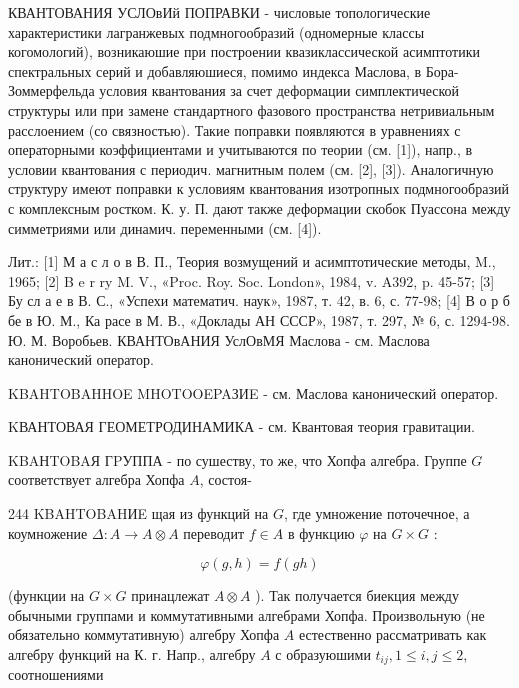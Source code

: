 \documentclass[10pt]{article}
\begin{document}
КВАНТОВАНИЯ УСЛОвИй ПОПРАВКИ - числовые топологические характеристики лагранжевых подмногообразий (одномерные классы когомологий), возникаюшие при построении квазиклассической асимптотики спектральных серий и добавляюшиеся, помимо индекса Маслова, в Бора-Зоммерфельда условия квантования за счет деформации симплектической структуры или при замене стандартного фазового пространства нетривиальным расслоением (со связностью). Такие поправки появляются в уравнениях с операторными коэффициентами и учитываются по теории (см. [1]), напр., в условии квантования с периодич. магнитным полем (см. [2], [3]). Аналогичную структуру имеют поправки к условиям квантования изотропных подмногообразий с комплексным ростком. К. у. П. дают также деформации скобок Пуассона между симметриями или динамич. переменными (см. [4]).



Лит.: [1] М а с л о в В. П., Теория возмущений и асимптотические методы, M., 1965; [2] B e r ry M. V., «Proc. Roy. Soc. London», 1984, v. A392, p. 45-57; [3] Бу сл а е в В. С., «Успехи математич. наук», 1987, т. 42, в. 6, с. 77-98; [4] В о р б бе в Ю. М., Ка расе в М. В., «Доклады АН СССР», 1987, т. 297, № 6, с. 1294-98. Ю. М. Воробьев. КВАНТОвАНИЯ УслОвМЯ Маслова - см. Маслова канонический оператор.



KBAHTOBAHHOE MHOTOOEPAЗИE - см. Маслова канонический оператор.



KВАНТОВАЯ ГЕОМЕТРОДИНАМИКА - см. Квантовая теория гравитации.



KBAНTOBAЯ ГPУППА - по сушеству, то же, что Хопфа алгебра. Группе $G$ соответствует алгебра Хопфа $A$, состоя-



244 KBAHTOBAHИE щая из функций на $G$, где умножение поточечное, а коумножение $\Delta: A \rightarrow A \otimes A$ переводит $f \in A$ в функцию $\varphi$ на $G \times G$ :



\[

\varphi(g, h)=f(g h)

\]



(функции на $G \times G$ принацлежат $A \otimes A$ ). Так получается биекция между обычными группами и коммутативными алгебрами Хопфа. Произвольную (не обязательно коммутативную) алгебру Хопфа $A$ естественно рассматривать как алгебру функций на К. г. Напр., алгебру $A$ с образуюшими $t_{i j}, 1 \leqslant i, j \leqslant 2$, соотношениями
\end{document}
